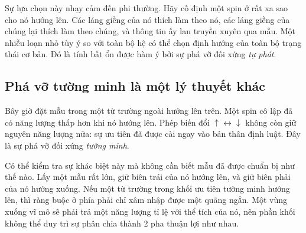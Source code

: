 Sự lựa chọn này nhạy cảm đến phi thường. Hãy cố định một spin ở rất xa sao cho nó hướng lên. Các láng giềng của nó thích làm theo nó, các láng giềng của chúng lại thích làm theo chúng, và thông tin ấy lan truyền xuyên qua mẫu. Một nhiễu loạn nhỏ tùy ý so với toàn bộ hệ có thể chọn định hướng của toàn bộ trạng thái cơ bản. Đó là tính bất ổn được hàm ý bởi sự phá vỡ đối xứng \emph{tự phát}.

\begin{classroomqa}
\end{classroomqa}

\begin{classroomqa}
\end{classroomqa}

\subsection{Phá vỡ tường minh là một lý thuyết khác}

Bây giờ đặt mẫu trong một từ trường ngoài hướng lên trên. Một spin cô lập đã có năng lượng thấp hơn khi nó hướng lên. Phép biến đổi \(\uparrow\leftrightarrow\downarrow\) không còn giữ nguyên năng lượng nữa: sự ưu tiên đã được cài ngay vào bản thân định luật. Đây là sự phá vỡ đối xứng \emph{tường minh}.

Có thể kiểm tra sự khác biệt này mà không cần biết mẫu đã được chuẩn bị như thế nào. Lấy một mẫu rất lớn, giữ biên trái của nó hướng lên, và giữ biên phải của nó hướng xuống. Nếu một từ trường trong khối ưu tiên tường minh hướng lên, thì ràng buộc ở phía phải chỉ xâm nhập được một quãng ngắn. Một vùng xuống vĩ mô sẽ phải trả một năng lượng tỉ lệ với thể tích của nó, nên phần khối không thể duy trì sự phân chia thành 2 pha thuận lợi như nhau.

